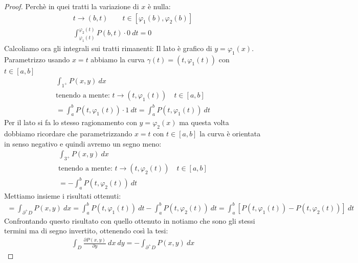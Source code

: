 \documentclass[a4paper, oneside]{article}
\begin{document}
\begin{proof}
Perchè in quei tratti la variazione di $x$ è nulla:\\
\begin{gather*}
  t \to (b,t) \qquad t \in [\varphi_1(b), \varphi_2(b)] \\
  \int_{\varphi_1(t)}^{\varphi_2(t)} P(b,t) \cdot 0 \ dt = 0
\end{gather*}
Calcoliamo ora gli integrali sui tratti rimanenti:
Il lato  è grafico di $y = \varphi_1(x)$. Parametrizzo usando $x = t$ abbiamo la curva $\gamma(t) = (t, \varphi_1(t))$ con $t \in[a,b]$\\
\begin{gather*}
  \int_{\boxed{1}^+} P(x,y) \ dx \\
  \text{tenendo a mente: } t \to (t, \varphi_1(t)) \quad t \in [a,b]\\
  = \int_a^b P(t,\varphi_1(t)) \cdot 1 \ dt = \int_a^b P(t,\varphi_1(t)) \ dt
\end{gather*}
Per il lato  si fa lo stesso ragionamento con $y = \varphi_2(x)$ ma questa volta dobbiamo ricordare che parametrizzando $x=t$ con $t \in[a,b]$ la curva è orientata in senso negativo e quindi avremo un segno meno:
\begin{gather*}
  \int_{\boxed{3}^+} P(x,y) \ dx \\
  \text{tenendo a mente: } t \to (t, \varphi_2(t)) \quad t \in [a,b]\\  
  = -\int_a^b P(t,\varphi_2(t)) \ dt
\end{gather*}
Mettiamo insieme i risultati ottenuti:
\begin{gather*}
    = \int_{\partial^+ D} P(x,y) \ dx = \int_a^b P(t,\varphi_1(t)) \ dt - \int_a^b P(t,\varphi_2(t)) \ dt = \int_a^b \left[ P(t,\varphi_1(t)) - P(t,\varphi_2(t)) \right] \ dt
\end{gather*}
Confrontando questo risultato con quello ottenuto in \fbox{*} notiamo che sono gli stessi termini ma di segno invertito, ottenendo così la tesi:
\begin{gather*}
    \int_D \frac{\partial P(x,y)}{\partial y} \ dx \ dy = -\int_{\partial^+ D} P(x,y) \ dx
\end{gather*}
\end{proof}
\end{document}
